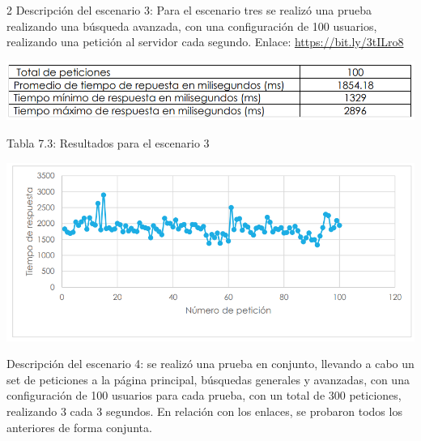 \documentclass[12pt,spanish,Letterpaper,openany]{book}
\begin{document}
\begin {multicols}{2}
Descripción del escenario 3: Para el escenario tres se realizó una prueba realizando una búsqueda avanzada, con una configuración de 100 usuarios, realizando una petición al servidor cada segundo.
Enlace: \url{https://bit.ly/3tILro8}

\begin {center}

\noindent\begin{minipage}[c]{\columnwidth}
\centering

\begin{center}\includegraphics[width=1\linewidth]{images/05_08} \end{center}
\vspace{0.01cm}
\footnotesize
\centering

Tabla 7.3: Resultados para el escenario 3

\end{minipage}

\end {center}

\begin {flushleft}
\noindent\begin{minipage}[c]{\columnwidth}

\includegraphics[width=1\linewidth]{images/05_09}

\end{minipage}

\end {flushleft}

Descripción del escenario 4: se realizó una prueba en conjunto, llevando a cabo un set de peticiones a la página principal, búsquedas generales y avanzadas, con una configuración de 100 usuarios para cada prueba, con un total de 300 peticiones, realizando 3 cada 3 segundos. En relación con los enlaces, se probaron todos los anteriores de forma conjunta.


\end{multicols}
\end{document}
